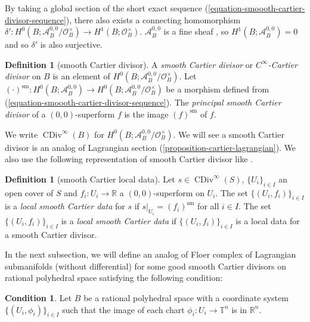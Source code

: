 \documentclass[a4paper,dvipdfmx,reqno,12pt]{amsart}
\theoremstyle{definition}
\newtheorem{definition}[theorem]{Definition}
\newtheorem{condition}[theorem]{Condition}
\newcommand{\opn}[1]{\operatorname{#1}}
\numberwithin{equation}{section}
\begin{document}
By taking a global section of the
short exact sequence
(\ref{equation-smoooth-cartier-divisor-sequence}),
there also exists a connecting homomorphism 
$\delta' \colon 
H^{0}(B;\mathcal{A}^{0,0}_{B}/\mathcal{O}^{\times}_B)
\to H^{1}(B;\mathcal{O}^{\times}_B)$. 
$\mathcal{A}^{0,0}_B$ is a fine sheaf 
\cite[Proposition 2.26]{MR3903579}, so 
$H^{1}(B;\mathcal{A}^{0,0}_B)=0$ and 
so $\delta'$ is also surjective.

\begin{definition}[{smooth Cartier divisor}]
A \emph{smooth Cartier divisor} or 
\emph{$C^{\infty}$-Cartier divisor} on $B$ is an element of
$H^{0}(B;\mathcal{A}^{0,0}_{B}/\mathcal{O}^{\times}_B)$.
Let 
$(\cdot)^{\mathrm{sm}}\colon 
H^{0}(B;\mathcal{A}^{0,0}_B)\to 
H^{0}(B;\mathcal{A}^{0,0}_{B}/\mathcal{O}^{\times}_B)$ 
be a morphism defined from 
(\ref{equation-smoooth-cartier-divisor-sequence}).
The \emph{principal smooth Cartier divisor} of a $(0,0)$-superform 
$f$ is the image $(f)^{\mathrm{sm}}$ of $f$.
\end{definition}
We write $\opn{CDiv}^{\infty}(B)$ for 
$H^{0}(B;\mathcal{A}^{0,0}_{B}/\mathcal{O}^{\times}_B)$.
We will see a smooth Cartier divisor is
an analog of Lagrangian section 
(\cref{proposition-cartier-lagrangian}).
We also use the following representation of 
smooth Cartier divisor like 
\cite[Definition 4.0.12]{MR2810322}.
\begin{definition}[{smooth Cartier local data}]
Let $s\in \opn{CDiv}^{\infty}(S)$, 
$\{U_i\}_{i\in I}$ an open cover of $S$ and 
$f_i\colon U_i \to \mathbb{R}$ a $(0,0)$-superform
on $U_i$. The set 
$\{(U_i,f_i)\}_{i\in I}$ is 
a \emph{local smooth Cartier data} for $s$ if 
$s|_{U_i}=(f_i)^{\mathrm{sm}}$ for all 
$i\in I$. The set $\{(U_i,f_i)\}_{i\in I}$ is a
\emph{local smooth Cartier data} if 
$\{(U_i,f_i)\}_{i\in I}$ is a local data for a smooth
Cartier divisor.
\end{definition}


In the next subsection, 
we will define an analog of Floer complex of 
Lagrangian submanifolds
(without differential) for some good smooth Cartier 
divisors on rational polyhedral space satisfying 
the following condition:

\begin{condition}
\label{condition-Rn}
Let $B$ be a rational polyhedral space with 
a coordinate system $\{(U_i,\phi_i)\}_{i\in I}$
such that the image of each chart 
$\phi_i\colon U_i \to \mathbb{T}^{n}$
is in $\mathbb{R}^{n}$.
\end{condition}
\end{document}
